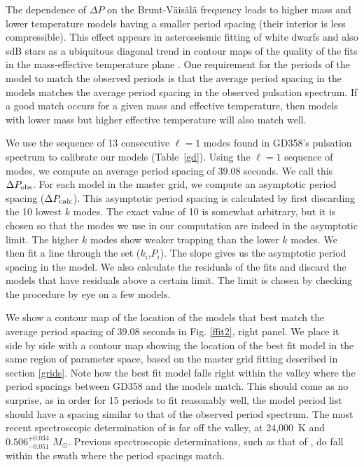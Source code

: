 \documentclass[12pt,preprint]{aastex}
\newcommand{\bvf}{Brunt-V\"ais\"al\"a }
\newcommand{\msun}{$M_\odot$}
\begin{document}
The dependence of $\Delta P$ on the \bvf frequency leads to higher mass and lower temperature models 
having a smaller period spacing (their interior is less compressible). This effect appears in asteroseismic 
fitting of white dwarfs and also sdB stars as a ubiquitous diagonal trend in contour maps of the quality 
of the fits in the mass-effective temperature plane \citep[e.g][]{Bischoff-Kim14,Castanheira09,Charpinet08}. 
One requirement for the periods of the model to match the observed periods is that the average period spacing 
in the models matches the average period spacing in the observed pulsation spectrum. If a good match occurs 
for a given mass and effective temperature, then models with lower mass but higher effective temperature 
will also match well.

We use the sequence of 13 consecutive $\ell=1$ modes found in GD358's pulsation spectrum to calibrate our models (Table~\ref{gd}). 
Using the $\ell=1$ sequence of modes, we compute an average period spacing of 39.08 seconds. We call 
this $\Delta P_{\rm obs}$. For each model in the master grid, we compute an asymptotic period spacing 
($\Delta P_{\rm calc}$). This asymptotic period spacing is calculated by first discarding the 10 lowest $k$ modes. 
The exact value of 10 is somewhat arbitrary, but it is chosen so that the modes we use in 
our computation are indeed in the asymptotic limit. The higher $k$ modes show weaker trapping than the 
lower $k$ modes. We then fit a line through the set ($k_i$,$P_i$). The slope gives us the asymptotic 
period spacing in the model. We also calculate the residuals of the fits and discard the models that have 
residuals above a certain limit. The limit is chosen by checking the procedure 
by eye on a few models. 

We show a contour map of the location of the models that best match the average period spacing of 
39.08 seconds in Fig. \ref{ffit2}, right panel. We place it side by side with a contour map showing 
the location of the best fit model in the same region of parameter space, based on the master grid 
fitting described in section \ref{grids}. Note how the best fit model falls right within the valley 
where the period spacings between GD358 and the models match. This should come as no surprise, as in 
order for 15 periods to fit reasonably well, the model period list should have a spacing similar to 
that of the observed period spectrum. The most recent spectroscopic determination of \citet{Koester2013} 
is far off the valley, at 24,000~K and $0.506^{+0.034}_{-0.051}$ \msun. Previous spectroscopic determinations, 
such as that of \citet{Bergeron2011}, do fall within the swath where the period spacings match.
\end{document}
